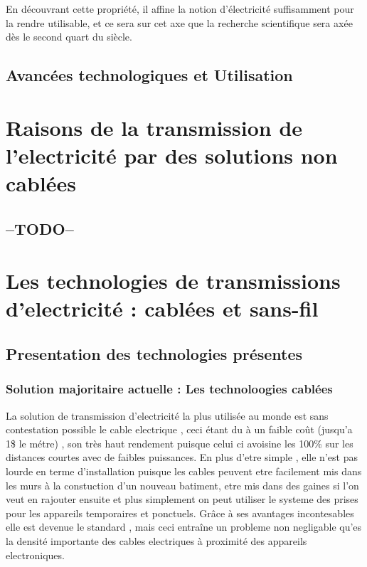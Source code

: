 \documentclass[11pt]{report}
\begin{document}
    En découvrant cette propriété, il affine la notion d'électricité suffisamment pour la rendre utilisable, et ce sera sur cet axe que la recherche scientifique sera axée dès le second quart du siècle.
\section{Avancées technologiques et Utilisation}

\chapter{Raisons de la transmission de l'electricité par des solutions non cablées} %
\section{--TODO--}

\chapter{Les technologies de transmissions d'electricité : cablées et sans-fil} %
\section{Presentation des technologies présentes}
\subsection{Solution majoritaire actuelle : Les technoloogies cablées}
	La solution de transmission d'electricité la plus utilisée au monde est sans contestation possible le cable electrique , ceci étant du à un faible coût (jusqu'a 1\$ le métre) , son très haut rendement puisque celui ci avoisine les 100\% sur les distances courtes avec de faibles puissances. En plus d'etre simple , elle n'est pas lourde en terme d'installation puisque les cables peuvent etre facilement mis dans les murs à la constuction d'un nouveau batiment, etre mis dans des gaines si l'on veut en rajouter ensuite et plus simplement on peut utiliser le systeme des prises pour les appareils temporaires et ponctuels. Grâce à ses avantages incontesables elle est devenue le standard , mais ceci entraîne un probleme non negligable qu'es la densité importante des cables electriques à proximité des appareils electroniques.
	
\end{document}
